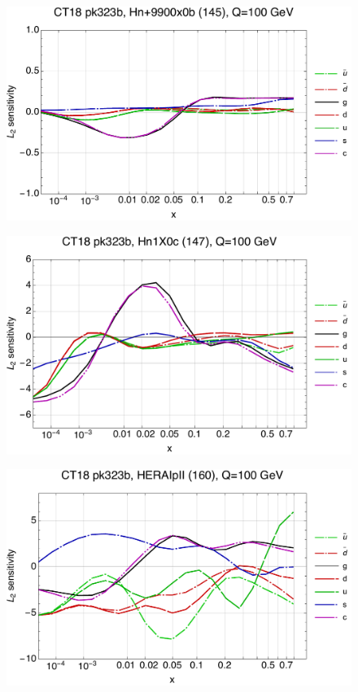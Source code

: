 \documentclass[10pt,aps,prd,floatfix,titlepage]{revtex4}
\begin{document}
\begin{figure}
\includegraphics[width=\textwidth,height=0.44\textheight,keepaspectratio]{1/145_ct18nn_L2_q100_Sf_1.pdf}
\caption{}
\end{figure}
\clearpage
\begin{figure}
\includegraphics[width=\textwidth,height=0.44\textheight,keepaspectratio]{1/147_ct18nn_L2_q100_Sf_1.pdf}
\caption{}
\end{figure}
\begin{figure}
\includegraphics[width=\textwidth,height=0.44\textheight,keepaspectratio]{1/160_ct18nn_L2_q100_Sf_1.pdf}
\caption{}
\end{figure}
\end{document}
